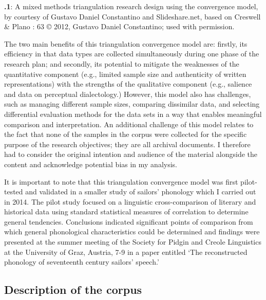  

\textbf{.1}: A mixed methods triangulation research design using the convergence model, by courtesy of Gustavo Daniel Constantino and Slideshare.net, based on Creswell \& Plano \citealt{Clark2007}: 63 © 2012, Gustavo Daniel Constantino; used with permission. 



The two main benefits of this triangulation convergence model are: firstly, its efficiency in that data types are collected simultaneously during one phase of the research plan; and secondly, its potential to mitigate the weaknesses of the quantitative component (e.g., limited sample size and authenticity of written representations) with the strengths of the qualitative component (e.g., salience and data on perceptual dialectology.) However, this model also has challenges, such as managing different sample sizes, comparing dissimilar data, and selecting differential evaluation methods for the data sets in a way that enables meaningful comparison and interpretation. An additional challenge of this model relates to the fact that none of the samples in the corpus were collected for the specific purpose of the research objectives; they are all archival documents. I therefore had to consider the original intention and audience of the material alongside the content and acknowledge potential bias in my analysis. 



It is important to note that this triangulation convergence model was first pilot-tested and validated in a smaller study of sailors’ phonology which I carried out in 2014. The pilot study focused on a linguistic cross-comparison of literary and historical data using standard statistical measures of correlation to determine general tendencies. Conclusions indicated significant points of comparison from which general phonological characteristics could be determined and findings were presented at the summer meeting of the Society for Pidgin and Creole Linguistics at the University of Graz, Austria, 7-9 \citealt{July2015} in a paper entitled ‘The reconstructed phonology of seventeenth century sailors’ speech.’



\subsection{\textbf{Description} \textbf{of} \textbf{the} \textbf{corpus}}%



